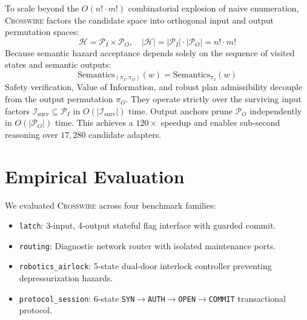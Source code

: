 \documentclass[10pt,twocolumn,letterpaper]{article}
\begin{document}
To scale beyond the $O(n! \cdot m!)$ combinatorial explosion of naive enumeration, \textsc{Crosswire} factors the candidate space into orthogonal input and output permutation spaces:
\begin{equation}
    \mathcal{H} = \mathcal{P}_I \times \mathcal{P}_O, \quad |\mathcal{H}| = |\mathcal{P}_I| \cdot |\mathcal{P}_O| = n! \cdot m!
\end{equation}
Because semantic hazard acceptance depends solely on the sequence of visited states and semantic outputs:
\begin{equation}
    \text{Semantics}_{(\pi_I, \pi_O)}(w) = \text{Semantics}_{\pi_I}(w)
\end{equation}
Safety verification, Value of Information, and robust plan admissibility decouple from the output permutation $\pi_O$. They operate strictly over the surviving input factors $\mathcal{I}_{\text{surv}} \subseteq \mathcal{P}_I$ in $O(|\mathcal{I}_{\text{surv}}|)$ time. Output anchors prune $\mathcal{P}_O$ independently in $O(|\mathcal{P}_O|)$ time. This achieves a $120\times$ speedup and enables sub-second reasoning over $17,280$ candidate adapters.

\section{Empirical Evaluation}
\label{sec:eval}

We evaluated \textsc{Crosswire} across four benchmark families:
\begin{itemize}
    \item \texttt{latch}: 3-input, 4-output stateful flag interface with guarded commit.
    \item \texttt{routing}: Diagnostic network router with isolated maintenance ports.
    \item \texttt{robotics\_airlock}: 5-state dual-door interlock controller preventing depressurization hazards.
    \item \texttt{protocol\_session}: 6-state \texttt{SYN}$\to$\texttt{AUTH}$\to$\texttt{OPEN}$\to$\texttt{COMMIT} transactional protocol.
\end{itemize}
\end{document}
